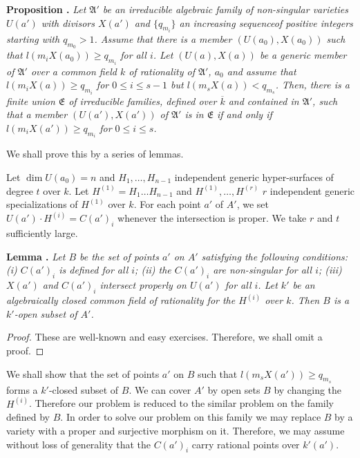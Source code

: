 \medskip
\noindent
{\bf Proposition .\label{art14-app-prop1.1}}
{\em Let $\mathfrak{A}'$ be an irreducible algebraic family of non-sin\-gular varieties $U(a')$ with divisors $X(a')$ and $\{q_{m_{i}}\}$ an increasing sequence\pageoriginale of positive integers starting with $q_{m_{0}}>1$. Assume that there is a member $(U(a_{0}), X(a_{0}))$ such that $l(m_{i}X(a_{0}))\geq q_{m_{i}}$ for all $i$. Let $(U(a), X(a))$ be a generic member of $\mathfrak{A}'$ over a common field $k$ of rationality of $\mathfrak{A}'$, $a_{0}$ and assume that $l(m_{i}X(a))\geq q_{m_{i}}$ for $0\leq i\leq s-1$ but $l(m_{s}X(a))<q_{m_{s}}$. Then, there is a finite union $\mathfrak{E}$ of irreducible families, defined over $\overline{k}$ and contained in $\mathfrak{A}'$, such that a member $(U(a'),X(a'))$ of $\mathfrak{A}'$ is in $\mathfrak{E}$ if and only if $l(m_{i}X(a'))\geq q_{m_{i}}$ for $0\leq i\leq s$.}
\smallskip

We shall prove this by a series of lemmas.

Let $\dim U(a_{0})=n$ and $H_{1},\ldots,H_{n-1}$ independent generic hyper-surfaces of degree $t$ over $k$. Let $H^{(1)}=H_{1}\ldots H_{n-1}$ and $H^{(1)},\ldots,H^{(r)}$ $r$ independent generic specializations of $H^{(1)}$ over $k$. For each point $a'$ of $A'$, we set $U(a')\cdot H^{(i)}=C(a')_{i}$ whenever the intersection is proper. We take $r$ and $t$ sufficiently large.

\medskip
\noindent
{\bf Lemma .\label{art14-app-lem1.2}}
{\em Let $B$ be the set of points $a'$ on $A'$ satisfying the following conditions: {\rm(i)} $C(a')_{i}$ is defined for all $i$; {\rm(ii)} the $C(a')_{i}$ are non-singular for all $i$; {\rm(iii)} $X(a')$ and $C(a')_{i}$ intersect properly on $U(a')$ for all $i$. Let $k'$ be an algebraically closed common field of rationality for the $H^{(i)}$ over $k$. Then $B$ is a $k'$-open subset of $A'$.}

\begin{proof}
These are well-known and easy exercises. Therefore, we shall omit a proof.
\end{proof}

We shall show that the set of points $a'$ on $B$ such that $l(m_{s}X(a'))\geq q_{m_{s}}$ forms a $k'$-closed subset of $B$. We can cover $A'$ by open sets $B$ by changing the $H^{(i)}$. Therefore our problem is reduced to the similar problem on the family defined by $B$. In order to solve our problem on this family we may replace $B$ by a variety with a proper and surjective morphism on it. Therefore, we may assume without loss of generality that the $C(a')_{i}$ carry rational points over $k'(a')$.

